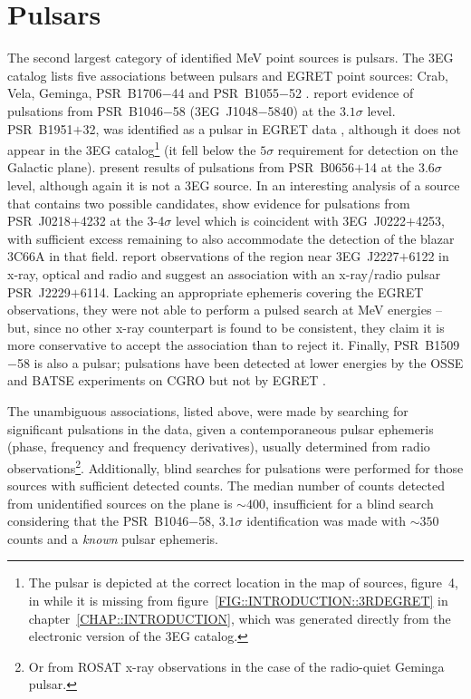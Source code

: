 \section{Pulsars}
\label{SEC::SOURCES::PULSARS}

\enlargethispage{8pt}
The second largest category of identified MeV \Gray point sources is
pulsars. The 3EG catalog lists five associations between pulsars and
EGRET point sources: Crab, Vela, Geminga, PSR~B1706$-$44 and
PSR~B1055$-$52 \citep{REF::NOLAN::AAS1996}.
\citet{REF::KASPI::APJ2000} report evidence of pulsations from
PSR~B1046$-$58 (3EG~J1048$-$5840) at the $3.1\sigma$ level. PSR~B1951$+$32,
was identified as a pulsar in EGRET data
\citep{REF::RAMANAMURTHY::APJ1996}, although it does not appear in the
3EG catalog\footnote{The pulsar is depicted at the correct location in
the map of sources, figure~4, in
\citet{REF::HARTMAN::APJS1999} while it is missing from
figure~\ref{FIG::INTRODUCTION::3RDEGRET} in
chapter~\ref{CHAP::INTRODUCTION}, which was generated directly from
the electronic version of the 3EG catalog.} (it fell below the
$5\sigma$ requirement for detection on the Galactic
plane). \citet{REF::RAMANAMURTHY::APJ1995} present results of
pulsations from PSR~B0656$+$14 at the $3.6\sigma$ level, although
again it is not a 3EG source. In an interesting analysis of a source
that contains two possible candidates, \citet{REF::KUIPER::AA2000}
show evidence for pulsations from PSR~J0218$+$4232 at the 3-4$\sigma$
level which is coincident with 3EG~J0222$+$4253, with sufficient \Gray
excess remaining to also accommodate the detection of the blazar 3C66A
in that field. \citet{REF::HALPERN::APJ2001::2227PAPER2} report
observations of the region near 3EG~J2227$+$6122 in x-ray, optical and
radio and suggest an association with an x-ray/radio pulsar
PSR~J2229$+$6114. Lacking an appropriate ephemeris covering the EGRET
observations, they were not able to perform a pulsed search at MeV
energies -- but, since no other x-ray counterpart is found to be
consistent, they claim it is more conservative to accept the
association than to reject it. Finally, PSR~B1509$-$58 is also a \Gray
pulsar; pulsations have been detected at lower energies by the OSSE
and BATSE experiments on CGRO but not by EGRET
\citep{REF::ULMER::APJS1994}.

The unambiguous associations, listed above, were made by searching for
significant pulsations in the \Gray data, given a contemporaneous
pulsar ephemeris (phase, frequency and frequency derivatives), usually
determined from radio observations\footnote{Or from ROSAT x-ray
observations in the case of the radio-quiet Geminga
pulsar.}. Additionally, blind searches for pulsations were performed
for those sources with sufficient detected counts. The median number
of counts detected from unidentified sources on the plane is
$\sim400$, insufficient for a blind search considering that the
PSR~B1046$-$58, $3.1\sigma$ identification was made with $\sim350$
counts and a \textit{known} pulsar ephemeris.

